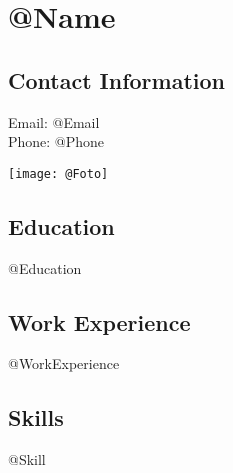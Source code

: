 \documentclass{article}
\begin{document}
\section*{@Name}
\subsection*{Contact Information}
Email: @Email \\
Phone: @Phone

\texttt{[image: @Foto]}

\subsection*{Education}
@Education
\subsection*{Work Experience}
@WorkExperience
\subsection*{Skills}
@Skill
\end{document}
